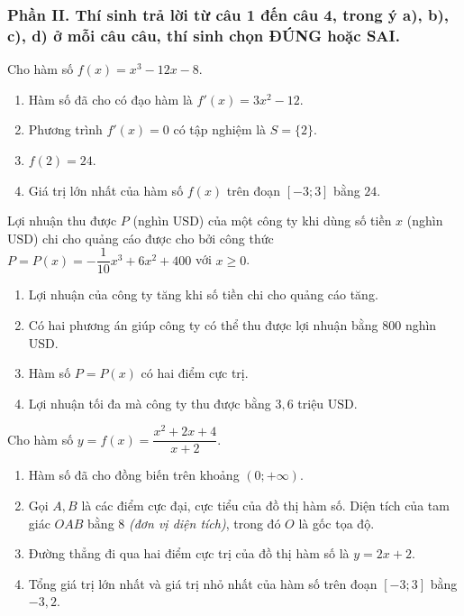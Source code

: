 \subsubsection*{Phần II. Thí sinh trả lời từ câu 1 đến câu 4, trong ý a), b), c), d) ở mỗi câu câu, thí sinh chọn ĐÚNG hoặc SAI.}
\setcounter{bt}{0}
\begin{baitap}
	Cho hàm số $f(x) = x^3 - 12x - 8$.
	\begin{enumerate}[\quad \bf a)]
		\item Hàm số đã cho có đạo hàm là $f'(x) = 3x^2 - 12$.
		\item Phương trình $f'(x) = 0$ có tập nghiệm là $S = \{2\}$.
		\item $f(2) = 24$.
		\item Giá trị lớn nhất của hàm số $f(x)$ trên đoạn $[-3; 3]$ bằng $24$.
	\end{enumerate}
\end{baitap}
\begin{baitap}
	 Lợi nhuận thu được $P$ (nghìn $\text{USD}$) của một công ty khi dùng số tiền $x$ (nghìn $\text{USD}$) chi cho quảng cáo được cho bởi công thức $P = P(x) = -\dfrac{1}{10}x^3 + 6x^2 + 400$ với $x \ge 0$.
	\begin{enumerate}[\quad \bf a)]
		\item Lợi nhuận của công ty tăng khi số tiền chi cho quảng cáo tăng.
		\item Có hai phương án giúp công ty có thể thu được lợi nhuận bằng $800$ nghìn $\text{USD}$.
		\item Hàm số $P = P(x)$ có hai điểm cực trị.
		\item Lợi nhuận tối đa mà công ty thu được bằng $3{,}6$ triệu $\text{USD}$.
	\end{enumerate}
\end{baitap}

\begin{baitap}
	Cho hàm số $y = f(x) = \dfrac{x^2 + 2x + 4}{x + 2}$.
	\begin{enumerate}[\quad \bf a)]
		\item Hàm số đã cho đồng biến trên khoảng $(0; +\infty)$.
		\item Gọi $A, B$ là các điểm cực đại, cực tiểu của đồ thị hàm số. Diện tích của tam giác $OAB$ bằng $8$ \textit{(đơn vị diện tích)}, trong đó $O$ là gốc tọa độ.
		\item Đường thẳng đi qua hai điểm cực trị của đồ thị hàm số là $y = 2x + 2$.
		\item Tổng giá trị lớn nhất và giá trị nhỏ nhất của hàm số trên đoạn $[-3; 3]$ bằng $-3{,}2$.
	\end{enumerate}
\end{baitap}

